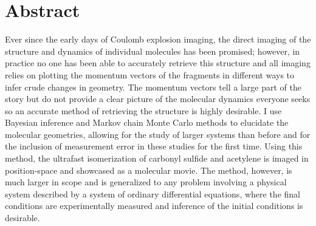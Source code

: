 \begingroup
\let\clearpage\relax
\let\cleardoublepage\relax
\let\cleardoublepage\relax


\chapter*{Abstract}
Ever since the early days of Coulomb explosion imaging, the direct imaging of the structure and dynamics of individual molecules has been promised; however, in practice no one has been able to accurately retrieve this structure and all imaging relies on plotting the momentum vectors of the fragments in different ways to infer crude changes in geometry. The momentum vectors tell a large part of the story but do not provide a clear picture of the molecular dynamics everyone seeks so an accurate method of retrieving the structure is highly desirable. I use Bayesian inference and Markov chain Monte Carlo methods to elucidate the molecular geometries, allowing for the study of larger systems than before and for the inclusion of measurement error in these studies for the first time. Using this method, the ultrafast isomerization of carbonyl sulfide and acetylene is imaged in position-space and showcased as a molecular movie. The method, however, is much larger in scope and is generalized to any problem involving a physical system described by a system of ordinary differential equations, where the final conditions are experimentally measured and inference of the initial conditions is desirable.

\vfill

\endgroup			

\vfill